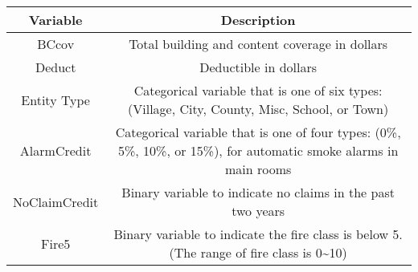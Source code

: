 \documentclass[]{book}
\theoremstyle{definition}
\theoremstyle{definition}
\theoremstyle{definition}
\theoremstyle{remark}
\begin{document}
\begin{longtable}[]{@{}cc@{}}
\toprule
\begin{minipage}[b]{0.21\columnwidth}\centering\strut
Variable\strut
\end{minipage} & \begin{minipage}[b]{0.42\columnwidth}\centering\strut
Description\strut
\end{minipage}\tabularnewline
\midrule
\endhead
\begin{minipage}[t]{0.21\columnwidth}\centering\strut
BCcov\strut
\end{minipage} & \begin{minipage}[t]{0.42\columnwidth}\centering\strut
Total building and content coverage in dollars\strut
\end{minipage}\tabularnewline
\begin{minipage}[t]{0.21\columnwidth}\centering\strut
Deduct\strut
\end{minipage} & \begin{minipage}[t]{0.42\columnwidth}\centering\strut
Deductible in dollars\strut
\end{minipage}\tabularnewline
\begin{minipage}[t]{0.21\columnwidth}\centering\strut
Entity Type\strut
\end{minipage} & \begin{minipage}[t]{0.42\columnwidth}\centering\strut
Categorical variable that is one of six types: (Village, City, County,
Misc, School, or Town)\strut
\end{minipage}\tabularnewline
\begin{minipage}[t]{0.21\columnwidth}\centering\strut
AlarmCredit\strut
\end{minipage} & \begin{minipage}[t]{0.42\columnwidth}\centering\strut
Categorical variable that is one of four types: (0\%, 5\%, 10\%, or
15\%), for automatic smoke alarms in main rooms\strut
\end{minipage}\tabularnewline
\begin{minipage}[t]{0.21\columnwidth}\centering\strut
NoClaimCredit\strut
\end{minipage} & \begin{minipage}[t]{0.42\columnwidth}\centering\strut
Binary variable to indicate no claims in the past two years\strut
\end{minipage}\tabularnewline
\begin{minipage}[t]{0.21\columnwidth}\centering\strut
Fire5\strut
\end{minipage} & \begin{minipage}[t]{0.42\columnwidth}\centering\strut
Binary variable to indicate the fire class is below 5. (The range of
fire class is 0\textasciitilde{}10)\strut
\end{minipage}\tabularnewline
\bottomrule
\end{longtable}
\end{document}
